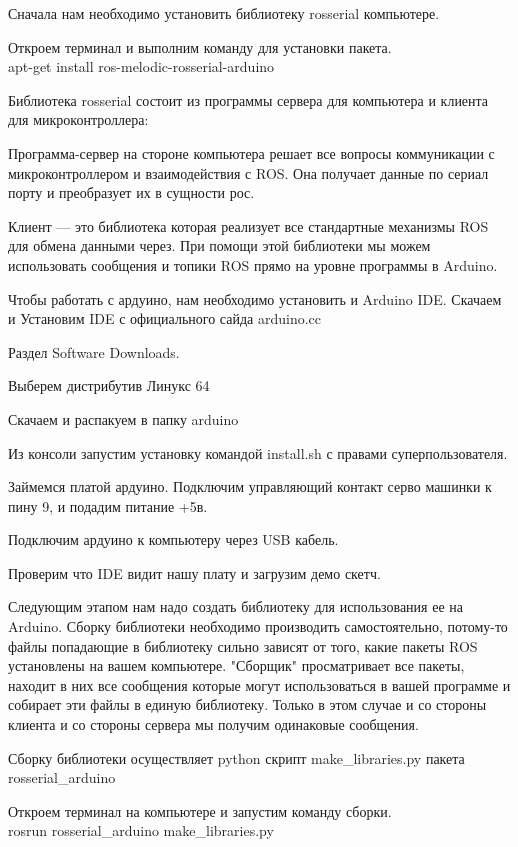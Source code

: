 Сначала нам необходимо установить библиотеку rosserial компьютере.

Откроем терминал и выполним команду для установки пакета.\\
apt-get install ros-melodic-rosserial-arduino

Библиотека rosserial состоит из программы сервера для компьютера и клиента для микроконтроллера:

Программа-сервер на стороне компьютера решает все вопросы коммуникации с микроконтроллером и взаимодействия с ROS. Она получает данные по сериал порту и преобразует их в сущности рос.

Клиент — это библиотека которая реализует все стандартные механизмы ROS для обмена данными через. При помощи этой библиотеки мы можем использовать сообщения и топики ROS прямо на уровне программы в Arduino.

Чтобы работать с ардуино, нам необходимо установить и Arduino IDE. Скачаем и Установим IDE с официального сайда arduino.cc

Раздел Software Downloads.

Выберем дистрибутив Линукс 64

Скачаем и распакуем в папку arduino

Из консоли запустим установку командой install.sh с правами суперпользователя.

Займемся платой ардуино. Подключим управляющий контакт серво машинки к пину 9, и подадим питание +5в.

Подключим ардуино к компьютеру через USB кабель.

Проверим что IDE видит нашу плату и загрузим демо скетч.

Следующим этапом нам надо создать библиотеку для использования ее на Arduino. Сборку библиотеки необходимо производить самостоятельно, потому-то файлы попадающие в библиотеку сильно зависят от того, какие пакеты ROS установлены на вашем компьютере. "Сборщик" просматривает все пакеты, находит в них все сообщения которые могут использоваться в вашей программе и собирает эти файлы в единую библиотеку. Только в этом случае и со стороны клиента и со стороны сервера мы получим одинаковые сообщения.

Сборку библиотеки осуществляет python скрипт make\_libraries.py пакета \linebreak rosserial\_arduino

Откроем терминал на компьютере и запустим команду сборки.\\
rosrun rosserial\_arduino make\_libraries.py

